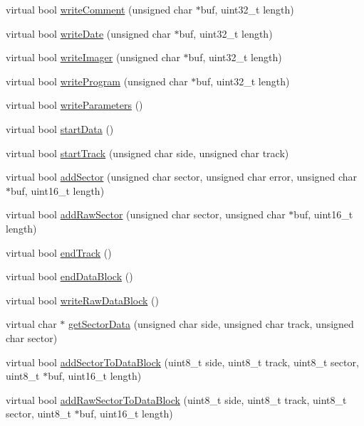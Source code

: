 \begin{DoxyCompactItemize}
virtual bool \hyperlink{classH17Disk_a00a11fce25f33fd27437ac32e5f6139a}{write\+Comment} (unsigned char $\ast$buf, uint32\+\_\+t length)
\item 
virtual bool \hyperlink{classH17Disk_ab397651808bc9ffd033584cbe5c1a8be}{write\+Date} (unsigned char $\ast$buf, uint32\+\_\+t length)
\item 
virtual bool \hyperlink{classH17Disk_abed5956f503f0cd51cdb8ebe6cb26c9d}{write\+Imager} (unsigned char $\ast$buf, uint32\+\_\+t length)
\item 
virtual bool \hyperlink{classH17Disk_a71da855358f9c45a027be13ae2009a5e}{write\+Program} (unsigned char $\ast$buf, uint32\+\_\+t length)
\item 
virtual bool \hyperlink{classH17Disk_a678d8b2633be207d5e3879f41991bcf5}{write\+Parameters} ()
\item 
virtual bool \hyperlink{classH17Disk_ae95a1ef9181111102784f12dc00e341b}{start\+Data} ()
\item 
virtual bool \hyperlink{classH17Disk_a0eecc11273d8051ccb68b6975fa55fba}{start\+Track} (unsigned char side, unsigned char track)
\item 
virtual bool \hyperlink{classH17Disk_a1fae79b5db5de046c5d7a2a3d72fcaab}{add\+Sector} (unsigned char sector, unsigned char error, unsigned char $\ast$buf, uint16\+\_\+t length)
\item 
virtual bool \hyperlink{classH17Disk_afd9cbcab815df9a9385ef3864be219e0}{add\+Raw\+Sector} (unsigned char sector, unsigned char $\ast$buf, uint16\+\_\+t length)
\item 
virtual bool \hyperlink{classH17Disk_a4ce50bcef73aef7b49adaeacc9c0990c}{end\+Track} ()
\item 
virtual bool \hyperlink{classH17Disk_a846793318bb41bf41782dd16b156ce14}{end\+Data\+Block} ()
\item 
virtual bool \hyperlink{classH17Disk_a453aedc5aa6cb970c6e174eadb4c6479}{write\+Raw\+Data\+Block} ()
\item 
virtual char $\ast$ \hyperlink{classH17Disk_a0c6e6f10c3dceff61a31827a25e32043}{get\+Sector\+Data} (unsigned char side, unsigned char track, unsigned char sector)
\item 
virtual bool \hyperlink{classH17Disk_a49978c35eab8155da4475519bf5e6e78}{add\+Sector\+To\+Data\+Block} (uint8\+\_\+t side, uint8\+\_\+t track, uint8\+\_\+t sector, uint8\+\_\+t $\ast$buf, uint16\+\_\+t length)
\item 
virtual bool \hyperlink{classH17Disk_a498d909fe673835841cb862efc9d2589}{add\+Raw\+Sector\+To\+Data\+Block} (uint8\+\_\+t side, uint8\+\_\+t track, uint8\+\_\+t sector, uint8\+\_\+t $\ast$buf, uint16\+\_\+t length)
\end{DoxyCompactItemize}
